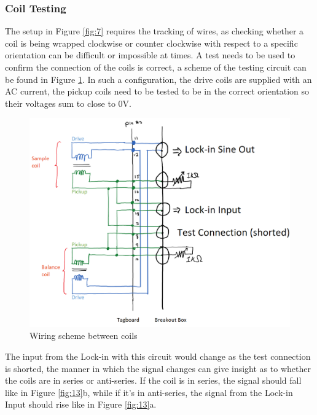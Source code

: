 \documentclass[11pt,onecolumn]{article}
\begin{document}
\subsubsection{Coil Testing}

The setup in Figure \ref{fig:7} requires the tracking of wires, as checking whether a coil is being wrapped clockwise or counter clockwise with respect to a specific orientation can be difficult or impossible at times. A test needs to be used to confirm the connection of the coils is correct, a scheme of the testing circuit can be found in Figure \ref{fig:6}. In such a configuration, the drive coils are supplied with an AC current, the pickup coils need to be tested to be in the correct orientation so their voltages sum to close to 0V.

\begin{figure}[ht]
	\centering
	\includegraphics[width=.6\columnwidth]{figures/wiring.png}
	\caption{Wiring scheme between coils}
	\label{fig:6}
\end{figure}

The input from the Lock-in with this circuit would change as the test connection is shorted, the manner in which the signal changes can give insight as to whether the coils are in series or anti-series. If the coil is in series, the signal should fall like in Figure \ref{fig:13}b, while if it's in anti-series, the signal from the Lock-in Input should rise like in Figure \ref{fig:13}a.
\end{document}
